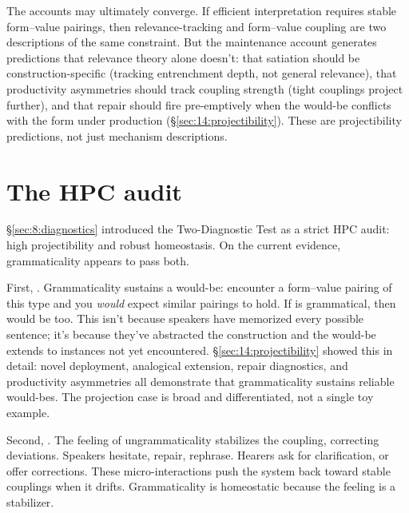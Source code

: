 The accounts may ultimately converge. If efficient interpretation requires stable form--value pairings, then relevance-tracking and form--value coupling are two descriptions of the same constraint. But the maintenance account generates predictions that relevance theory alone doesn't: that satiation should be construction-specific (tracking entrenchment depth, not general relevance), that productivity asymmetries should track coupling strength (tight couplings project further), and that repair should fire pre-emptively when the would-be conflicts with the form under production (§\ref{sec:14:projectibility}). These are projectibility predictions, not just mechanism descriptions.


\section{The HPC audit}
\label{sec:14:hpc-audit}

§\ref{sec:8:diagnostics} introduced the Two-Diagnostic Test as a strict HPC audit: high projectibility and robust homeostasis. On the current evidence, grammaticality appears to pass both.

First, . Grammaticality sustains a would-be: encounter a form--value pairing of this type and you \emph{would} expect similar pairings to hold. If  is grammatical, then  would be too. This isn't because speakers have memorized every possible sentence; it's because they've abstracted the construction and the would-be extends to instances not yet encountered. §\ref{sec:14:projectibility} showed this in detail: novel deployment, analogical extension, repair diagnostics, and productivity asymmetries all demonstrate that grammaticality sustains reliable would-bes. The projection case is broad and differentiated, not a single toy example.

Second, . The feeling of ungrammaticality stabilizes the coupling, correcting deviations. Speakers hesitate, repair, rephrase. Hearers ask for clarification, or offer corrections. These micro-interactions push the system back toward stable couplings when it drifts. Grammaticality is homeostatic because the feeling is a stabilizer.

